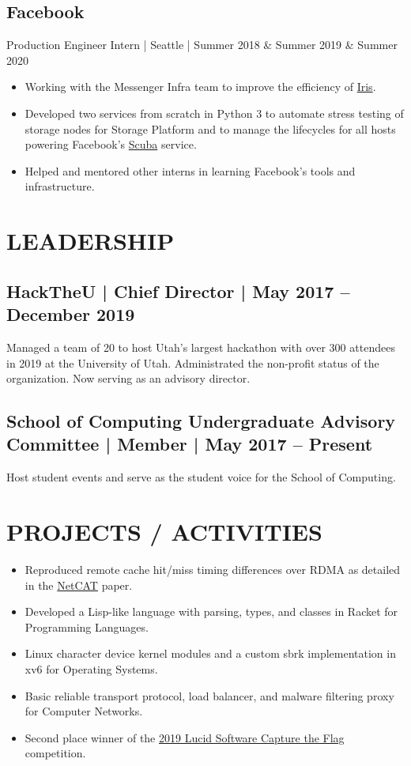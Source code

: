\documentclass[10pt, letterpaper]{resume}
\begin{document}
\subsection{Facebook}
Production Engineer Intern | Seattle | Summer 2018 \& Summer 2019 \& Summer 2020
\begin{itemize}
    \item Working with the Messenger Infra team to improve the efficiency of \href{https://engineering.fb.com/production-engineering/building-mobile-first-infrastructure-for-messenger/}{Iris}.
 \item Developed two services from scratch in Python 3 to automate stress testing of storage nodes for Storage Platform and to manage the lifecycles for all hosts powering Facebook's \href{https://research.fb.com/wp-content/uploads/2016/11/scuba-diving-into-data-at-facebook.pdf}{Scuba} service.
 \item Helped and mentored other interns in learning Facebook's tools and infrastructure.
\end{itemize}

\section{LEADERSHIP}
\subsection{HackTheU {\normalfont | Chief Director | May 2017 -- December 2019}}
Managed a team of 20 to host Utah’s largest hackathon with over 300 attendees in 2019 at the University of Utah. Administrated the non-profit status of the organization. Now serving as an advisory director.

\subsection{School of Computing Undergraduate Advisory Committee {\normalfont |  Member | May 2017 -- Present}}
Host student events and serve as the student voice for the School of Computing.

\section{PROJECTS / ACTIVITIES}
\begin{itemize}
 \item Reproduced remote cache hit/miss timing differences over RDMA as detailed in the \href{https://download.vusec.net/papers/netcat_sp20.pdf}{NetCAT} paper.
 \item Developed a Lisp-like language with parsing, types, and classes in Racket for Programming Languages.
 \item Linux character device kernel modules and a custom sbrk implementation in xv6 for Operating Systems.
 \item Basic reliable transport protocol, load balancer, and malware filtering proxy for Computer Networks.
 \item Second place winner of the \href{https://github.com/lucidsoftware/ctf2019}{2019 Lucid Software Capture the Flag} competition.
\end{itemize}
\end{document}
